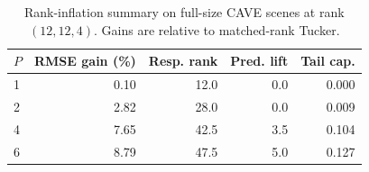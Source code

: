 \begin{table}[!t]
  \centering
  \caption{Rank-inflation summary on full-size CAVE scenes at rank $(12,12,4)$. Gains are relative to matched-rank Tucker.}
  \label{tab:rank-inflation-mechanism}
  \scriptsize
  \begin{tabular}{@{}lrrrr@{}}
    \toprule
    $P$ & RMSE gain (\%) & Resp. rank & Pred. lift & Tail cap. \\
    \midrule
    1 & 0.10 & 12.0 & 0.0 & 0.000 \\
    2 & 2.82 & 28.0 & 0.0 & 0.009 \\
    4 & 7.65 & 42.5 & 3.5 & 0.104 \\
    6 & 8.79 & 47.5 & 5.0 & 0.127 \\
    \bottomrule
  \end{tabular}
\end{table}
